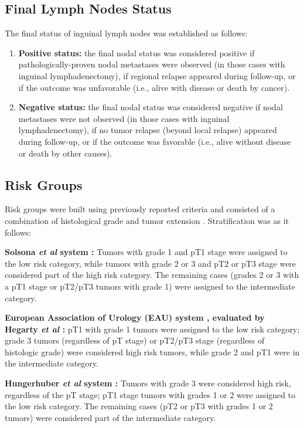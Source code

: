 \documentclass[11pt,letterpaper]{article}\usepackage[]{graphicx}\usepackage[]{color}
\begin{document}
\begin{multicols}{2}
\subsection*{Final Lymph Nodes Status}
The final status of inguinal lymph nodes was established as follows: 
\begin{enumerate}
        \item \textbf{Positive status:} the final nodal status was considered positive if pathologically-proven nodal metastases were observed (in those cases with inguinal lymphadenectomy), if regional relapse appeared during follow-up, or if the outcome was unfavorable (i.e., alive with disease or death by cancer).
        \item \textbf{Negative status:} the final nodal status was considered negative if nodal metastases were not observed (in those cases with inguinal lymphadenectomy), if no tumor relapse (beyond local relapse) appeared during follow-up, or if the outcome was favorable (i.e., alive without disease or death by other causes).
\end{enumerate}

\subsection*{Risk Groups}
Risk groups were built using previously reported criteria and consisted of a combination of histological grade and tumor extension \cite{Solsona2004,Solsona2001,Hungerhuber2006}. Stratification was as it follows:

\textbf{Solsona \emph{et al} system \cite{Solsona2001}:} Tumors with grade 1 and pT1 stage were assigned to the low risk category, while tumors with grade 2 or 3 and pT2 or pT3 stage were considered part of the high risk category. The remaining cases (grades 2 or 3 with a pT1 stage or pT2/pT3 tumors with grade 1) were assigned to the intermediate category.

\textbf{European Association of Urology (EAU) system \cite{Solsona2004}, evaluated by Hegarty \emph{et al} \cite{Hegarty2006}:} pT1 with grade 1 tumors were assigned to the low risk category; grade 3 tumors (regardless of pT stage) or pT2/pT3 stage (regardless of histologic grade) were considered high risk tumors, while grade 2 and pT1 were in the intermediate category.

\textbf{Hungerhuber \emph{et al} system \cite{Hungerhuber2006}:} Tumors with grade 3 were considered high risk, regardless of the pT stage; pT1 stage tumors with grades 1 or 2 were assigned to the low risk category. The remaining cases (pT2 or pT3 with grades 1 or 2 tumors) were considered part of the intermediate category.


\end{multicols}
\end{document}
